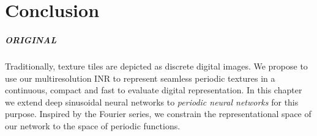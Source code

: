 


\chapter{Conclusion}




\paragraph{ORIGINAL}
Traditionally, texture tiles are depicted as discrete digital images. We propose to use our multiresolution INR to represent seamless periodic textures in a continuous, compact and fast to evaluate digital representation. In this chapter we extend deep sinusoidal neural networks to \textit{periodic neural networks} for this purpose. Inspired by the Fourier series, we constrain the representational space of our network to the space of periodic functions.

